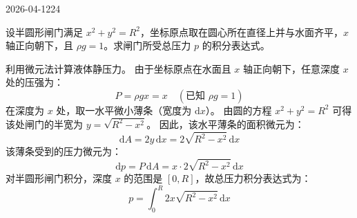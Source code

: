 \begin{mistake}{2026-04-12}{24}

\begin{problemcontent}
设半圆形闸门满足 \( x^2+y^2=R^2 \)，坐标原点取在圆心所在直径上并与水面齐平，\(x\) 轴正向朝下，且 \( \rho g=1 \)。求闸门所受总压力 \(p\) 的积分表达式。
\end{problemcontent}

\begin{solutioncontent}
利用微元法计算液体静压力。
由于坐标原点在水面且 \(x\) 轴正向朝下，任意深度 \(x\) 处的压强为：
\[
P = \rho g x = x \quad (\text{已知 } \rho g=1)
\]
在深度为 \(x\) 处，取一水平微小薄条（宽度为 \(\mathrm{d}x\)）。
由圆的方程 \( x^2+y^2=R^2 \) 可得该处闸门的半宽为 \(y = \sqrt{R^2-x^2}\)。
因此，该水平薄条的面积微元为：
\[
\mathrm{d}A = 2y \,\mathrm{d}x = 2\sqrt{R^2-x^2} \,\mathrm{d}x
\]
该薄条受到的压力微元为：
\[
\mathrm{d}p = P \,\mathrm{d}A = x \cdot 2\sqrt{R^2-x^2} \,\mathrm{d}x
\]
对半圆形闸门积分，深度 \(x\) 的范围是 \([0, R]\)，故总压力积分表达式为：
\[
p = \int_0^R 2x\sqrt{R^2-x^2} \,\mathrm{d}x
\]
\end{solutioncontent}


\end{mistake}
